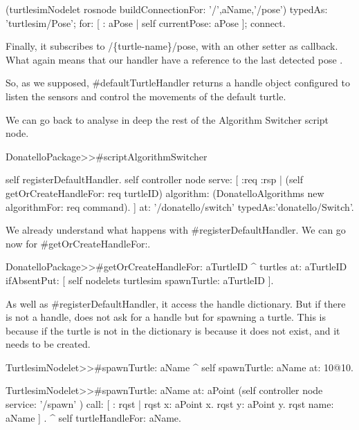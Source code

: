\documentclass[a4paper,10pt,twoside]{book}
\begin{document}
				\begin{code}
	(turtlesimNodelet rosnode buildConnectionFor: '/',aName,'/pose') 
			typedAs: 'turtlesim/Pose'; 
			for: [ : aPose | self currentPose: aPose ];
			connect.
	
				\end{code}
				
					Finally,  it subscribes to  /\{turtle-name\}/pose, with an other setter as callback. What again means that our handler have a reference to the last detected pose . 
		 	
			
			So, as we supposed, \#defaultTurtleHandler returns a handle object configured to listen the sensors and control the movements of the default turtle.
			
			We can go back to analyse in deep the rest of the Algorithm Switcher script node.
			
			 
			\begin{code}

DonatelloPackage>>#scriptAlgorithmSwitcher

	self registerDefaultHandler.
	self controller node serve: [ :req :rsp | 
		(self getOrCreateHandleFor: req turtleID)  algorithm: (DonatelloAlgorithms new algorithmFor: req command).		
	] at: '/donatello/switch' typedAs:'donatello/Switch'.

			\end{code}	
			
			We already understand what happens with \#registerDefaultHandler. We can go now for \#getOrCreateHandleFor:. 
			
						
			\begin{code}
DonatelloPackage>>#getOrCreateHandleFor: aTurtleID
	^ turtles at: aTurtleID ifAbsentPut: [ self nodelets turtlesim spawnTurtle: aTurtleID ].
			\end{code}
			
			
			As well as  \#registerDefaultHandler, it access the handle dictionary. But if there is not a handle, does not ask for a handle but for spawning a turtle. This is because if the turtle is not in the dictionary is because it does not exist, and it needs to be created. 
			
			 
			
			\begin{code}
TurtlesimNodelet>>#spawnTurtle: aName 
	^ self spawnTurtle: aName at: 10@10.	
	
	
TurtlesimNodelet>>#spawnTurtle: aName at: aPoint
	(self controller node service: '/spawn' ) call: [ : rqst | 
		rqst x: aPoint x. 
		rqst y: aPoint y. 
		rqst name: aName 
	] .
	^ self turtleHandleFor: aName.

			\end{code}
			
\end{document}

